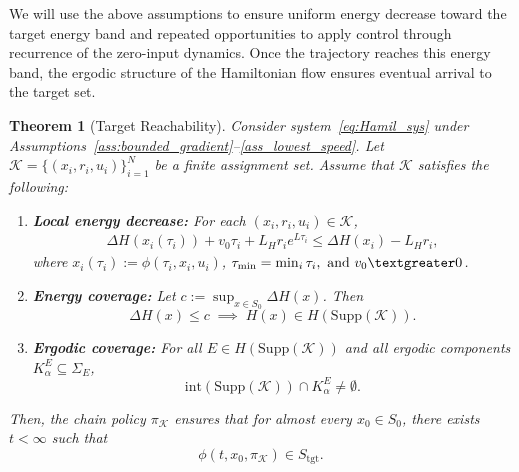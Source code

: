 \documentclass[letterpaper, 10 pt, conference]{ieeeconf}
\newtheorem{theorem}{Theorem}
\newcommand{\tgt}{\mathrm{tgt}}
\newcommand{\Supp}{\mathrm{Supp}}
\begin{document}
We will use the above assumptions to ensure uniform energy decrease toward the target energy band and repeated opportunities to apply control through recurrence of the zero-input dynamics. Once the trajectory reaches this energy band, the ergodic structure of the Hamiltonian flow ensures eventual arrival to the target set.

\begin{theorem}[Target Reachability]
\label{thm_general_reachability}
Consider system~\eqref{eq:Hamil_sys} under Assumptions~\ref{ass:bounded_gradient}--\ref{ass_lowest_speed}. 
Let $\mathcal{K} = \{(x_i, r_i, u_i)\}_{i=1}^N$ be a finite assignment set. 
Assume that $\mathcal{K}$ satisfies the following:

\begin{enumerate}
\item \textbf{Local energy decrease:}\label{condition1}
For each $(x_i,r_i,u_i)\in \mathcal{K}$,
\begin{align*}
\Delta H(x_i(\tau_i)) \!+\! v_0 \tau_i \!+\! L_H r_i e^{L \tau_i}
\!\le\! \Delta H(x_i) \!-\! L_H r_i,
\end{align*}
where $x_i(\tau_i):=\phi(\tau_i,x_i,u_i)$, $\tau_{\min}=\min_i\tau_i,\ \text{and }v_0 \textgreater 0$.
\item \textbf{Energy coverage:}\label{condition2}
Let $c := \sup_{x\in S_0} \Delta H(x)$. Then
\[
\Delta H(x)\le c \;\implies\; H(x)\in H(\Supp(\mathcal{K})).
\]
\item \textbf{Ergodic coverage:}\label{condition3}
For all $E \in H(\Supp(\mathcal{K}))$ and all ergodic components $K_\alpha^E \subseteq \Sigma_E$,
\[
\mathrm{int}(\Supp(\mathcal{K})) \cap K_\alpha^E \neq \emptyset.
\]
\end{enumerate}

Then, the chain policy $\pi_{\mathcal{K}}$ ensures that for almost every $x_0 \in S_0$, there exists $t<\infty$ such that
\[
\phi(t,x_0,\pi_{\mathcal{K}}) \in S_{\tgt}.
\]
\end{theorem}
\end{document}
